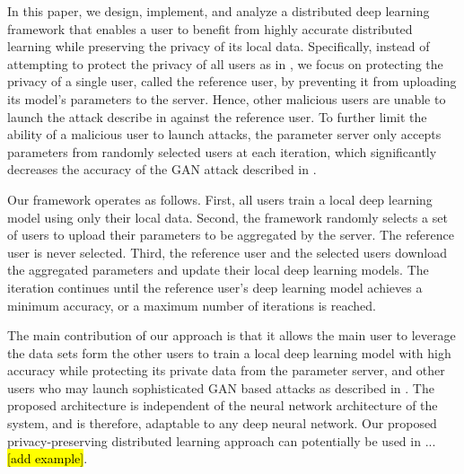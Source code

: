 \documentclass[conference]{IEEEtran}
\begin{document}
In this paper, we design, implement, and analyze a distributed deep learning framework that enables a user 
to benefit from highly accurate distributed learning while preserving the privacy of its local data. 
Specifically,  instead of attempting to protect the privacy of all users as in \cite{shokri2015privacy}, we focus on protecting the
privacy of a single user, called the reference user, by preventing it from uploading its model's parameters to the server. Hence,
other malicious users are unable to launch the attack describe in \cite{hitaj2017deep} against the reference user. To further limit the
ability of a malicious user to launch attacks, the parameter server only accepts parameters from randomly
selected users at each iteration, which significantly decreases the accuracy of the GAN attack described in \cite{hitaj2017deep}. 

Our framework operates as follows. First, all users train a local deep learning model using only their local data.
Second, the framework randomly selects a set of users to upload their parameters to be aggregated by the server. The reference user is
never selected. Third, the reference user and the selected users download the aggregated parameters and update their local
deep learning models. The iteration continues until the reference user's deep learning model achieves a minimum
accuracy, or a maximum number of iterations is reached.

The main contribution of our approach is that it allows the main user to leverage the data sets form the other users to train a local
deep learning model with high accuracy while protecting its private data from the parameter server, and other users who
may launch sophisticated GAN based attacks as described in \cite{hitaj2017deep}. The proposed architecture is independent of the
neural network architecture of the system, and is therefore, adaptable to any deep neural network. Our proposed privacy-preserving
distributed learning approach can potentially be used in ... \hl{[add example]}. 

\end{document}
